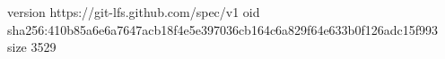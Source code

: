 version https://git-lfs.github.com/spec/v1
oid sha256:410b85a6e6a7647acb18f4e5e397036cb164c6a829f64e633b0f126adc15f993
size 3529
